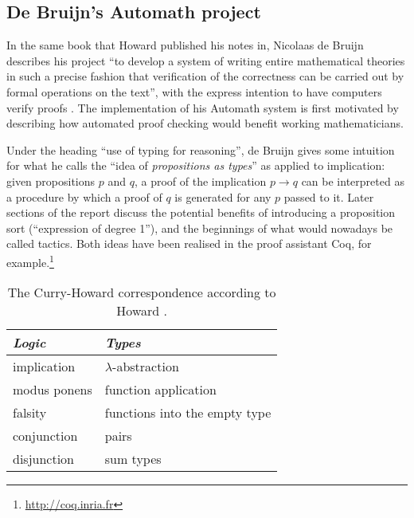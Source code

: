 \documentclass[12pt,toc=bibliography,numbers=noendperiod,
               footnotes=multiple,twoside]{scrartcl}
\begin{document}
\subsection{De Bruijn's Automath project}

In the same book that Howard published his notes in, Nicolaas de Bruijn describes his project \enquote{to develop a system of writing entire mathematical theories in such a precise fashion that verification of the correctness can be carried out by formal operations on the text}, with the express intention to have computers verify proofs \autocite{de_bruijn_survey_1980}. The implementation of his Automath system is first motivated by describing how automated proof checking would benefit working mathematicians.

Under the heading \enquote{use of typing for reasoning}, de Bruijn gives some intuition for what he calls the \enquote{idea of \emph{propositions as types}} as applied to implication: given propositions \(p\) and \(q\), a proof of the implication \(p \rightarrow q\) can be interpreted as a procedure by which a proof of \(q\) is generated for any \(p\) passed to it. Later sections of the report discuss the potential benefits of introducing a proposition sort (\enquote{expression of degree 1}), and the beginnings of what would nowadays be called tactics. Both ideas have been realised in the proof assistant Coq, for example.\footnote{\url{http://coq.inria.fr}}

\begin{table}[h]
    \centering
    \begin{tabular}{l l}
        \toprule
        \textit{Logic} & \textit{Types} \\
        \midrule
	implication & \(\lambda\)-abstraction \\
	modus ponens & function application \\
	falsity & functions into the empty type \\
	conjunction & pairs \\
	disjunction & sum types \\
        \bottomrule
    \end{tabular}
    \caption{The Curry-Howard correspondence according to Howard \parencite{howard_formulae-as-types_1980}.}
    \label{tab:howard}
\end{table}
\end{document}
